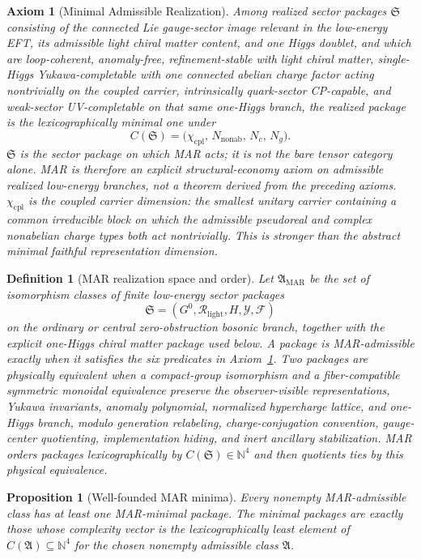 \documentclass[11pt]{article}
\newtheorem{proposition}[theorem]{Proposition}
\newtheorem{definition}[theorem]{Definition}
\newtheorem{axiom}[theorem]{Axiom}
\begin{document}
\begin{axiom}[Minimal Admissible Realization]\label{ax:mar}
Among realized sector packages \(\mathfrak S\) consisting of the connected Lie gauge-sector image relevant in the low-energy EFT, its admissible light chiral matter content, and one Higgs doublet, and which are loop-coherent, anomaly-free, refinement-stable with light chiral matter, single-Higgs Yukawa-completable with one connected abelian charge factor acting nontrivially on the coupled carrier, intrinsically quark-sector CP-capable, and weak-sector UV-completable on that same one-Higgs branch, the realized package is the lexicographically minimal one under
\[
C(\mathfrak S)=\bigl(\chi_{\mathrm{cpl}},\,N_{\mathrm{nonab}},\,N_c,\,N_g\bigr).
\]
\(\mathfrak S\) is the sector package on which MAR acts; it is not the bare tensor category alone. MAR is therefore an explicit structural-economy axiom on admissible realized low-energy branches, not a theorem derived from the preceding axioms. \(\chi_{\mathrm{cpl}}\) is the coupled carrier dimension: the smallest unitary carrier containing a common irreducible block on which the admissible pseudoreal and complex nonabelian charge types both act nontrivially. This is stronger than the abstract minimal faithful representation dimension.
\end{axiom}

\begin{definition}[MAR realization space and order]\label{def:mar-space}
Let \(\mathfrak A_{\mathrm{MAR}}\) be the set of isomorphism classes of finite low-energy sector packages
\[
\mathfrak S=(G^0,\mathcal R_{\mathrm{light}},H,\mathcal Y,\mathcal F)
\]
on the ordinary or central zero-obstruction bosonic branch, together with the explicit one-Higgs chiral matter package used below. A package is MAR-admissible exactly when it satisfies the six predicates in Axiom~\ref{ax:mar}. Two packages are physically equivalent when a compact-group isomorphism and a fiber-compatible symmetric monoidal equivalence preserve the observer-visible representations, Yukawa invariants, anomaly polynomial, normalized hypercharge lattice, and one-Higgs branch, modulo generation relabeling, charge-conjugation convention, gauge-center quotienting, implementation hiding, and inert ancillary stabilization. MAR orders packages lexicographically by \(C(\mathfrak S)\in\mathbb N^4\) and then quotients ties by this physical equivalence.
\end{definition}

\begin{proposition}[Well-founded MAR minima]\label{prop:mar-well-founded}
Every nonempty MAR-admissible class has at least one MAR-minimal package. The minimal packages are exactly those whose complexity vector is the lexicographically least element of \(C(\mathfrak A)\subseteq\mathbb N^4\) for the chosen nonempty admissible class \(\mathfrak A\).
\end{proposition}
\end{document}
